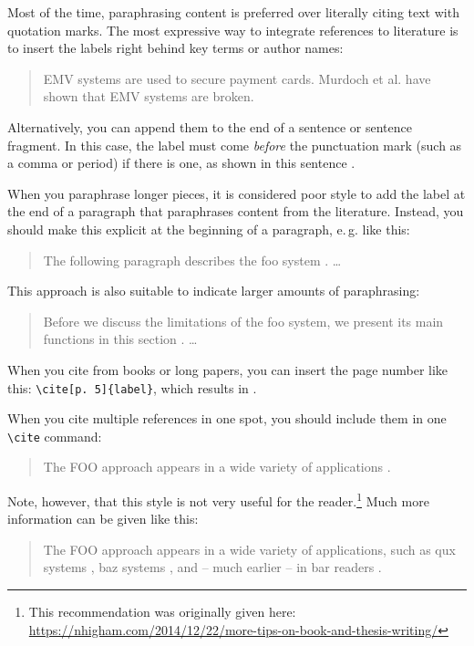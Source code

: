 Most of the time, paraphrasing content is preferred over literally citing text with quotation marks. The most expressive way to integrate references to literature is to insert the labels right behind key terms or author names:
\begin{quote}
  EMV systems \cite{anderson_ross_emv:_2014} are used to secure payment cards. Murdoch et al. \cite{murdoch_steven_j._chip_2010} have shown that EMV systems are broken.
\end{quote}

Alternatively, you can append them to the end of a sentence or sentence fragment. In this case, the label must come \emph{before} the punctuation mark (such as a comma or period) if there is one, as shown in this sentence \cite{Hintz02}.

When you paraphrase longer pieces, it is considered poor style to add the label at the end of a paragraph that paraphrases content from the literature. Instead, you should make this explicit at the beginning of a paragraph, e.\,g. like this:
\begin{quote}
  The following paragraph describes the foo system \cite{kou_weidong_secure_2003}. …
\end{quote}

This approach is also suitable to indicate larger amounts of paraphrasing:
\begin{quote}
  Before we discuss the limitations of the foo system, we present its main functions in this section \cite{kou_weidong_secure_2003}. …
\end{quote}

When you cite from books or long papers, you can insert the page number like this: \verb|\cite[p. 5]{label}|, which results in \cite[p. 5]{kou_weidong_secure_2003}.

When you cite multiple references in one spot, you should include them in one \verb|\cite| command:
\begin{quote}
  The FOO approach appears in a wide variety of applications \cite{murdoch_steven_j._chip_2010,anderson_ross_emv:_2014,kou_weidong_secure_2003}.
\end{quote}

Note, however, that this style is not very useful for the reader.\footnote{This recommendation was originally given here: \url{https://nhigham.com/2014/12/22/more-tips-on-book-and-thesis-writing/}} Much more information can be given like this:
\begin{quote}
The FOO approach appears in a wide variety of applications, such as qux systems \cite{murdoch_steven_j._chip_2010}, baz systems \cite{anderson_ross_emv:_2014}, and -- much earlier -- in bar readers \cite{kou_weidong_secure_2003}.
\end{quote}

